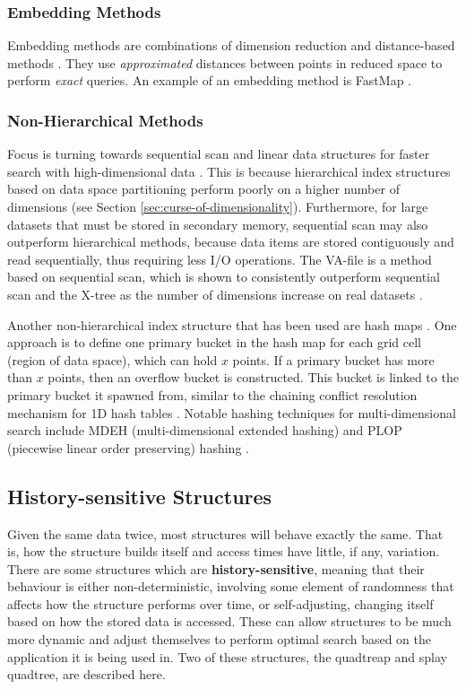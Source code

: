 \subsubsection{Embedding Methods}

Embedding methods are combinations of dimension reduction and distance-based methods \cite{md-structures-samet}. They use \textit{approximated} distances between points in reduced space to perform \textit{exact} queries. An example of an embedding method is FastMap \cite{fast-map}.

\subsubsection{Non-Hierarchical Methods}

Focus is turning towards sequential scan and linear data structures for faster search with high-dimensional data \cite{md-structures-samet, va-file}. This is because hierarchical index structures based on data space partitioning perform poorly on a higher number of dimensions (see Section \ref{sec:curse-of-dimensionality}). Furthermore, for large datasets that must be stored in secondary memory, sequential scan may also outperform hierarchical methods, because data items are stored contiguously and read sequentially, thus requiring less I/O operations. The VA-file is a method based on sequential scan, which is shown to consistently outperform sequential scan and the X-tree as the number of dimensions increase on real datasets \cite{va-file}.

Another non-hierarchical index structure that has been used are hash maps \cite{md-structures-samet}. One approach is to define one primary bucket in the hash map for each grid cell (region of data space), which can hold $x$ points. If a primary bucket has more than $x$ points, then an overflow bucket is constructed. This bucket is linked to the primary bucket it spawned from, similar to the chaining conflict resolution mechanism for 1D hash tables \cite{introduction-to-algorithms}. Notable hashing techniques for multi-dimensional search include MDEH (multi-dimensional extended hashing) and PLOP (piecewise linear order preserving) hashing \cite{md-structures-samet}.


\subsection{History-sensitive Structures}
\label{sec:history-sensitive-structures}

Given the same data twice, most structures will behave exactly the same. That is, how the structure builds itself and access times have little, if any, variation. There are some structures which are \textbf{history-sensitive}, meaning that their behaviour is either non-deterministic, involving some element of randomness that affects how the structure performs over time, or self-adjusting, changing itself based on how the stored data is accessed. These can allow structures to be much more dynamic and adjust themselves to perform optimal search based on the application it is being used in. Two of these structures, the quadtreap and splay quadtree, are described here.

